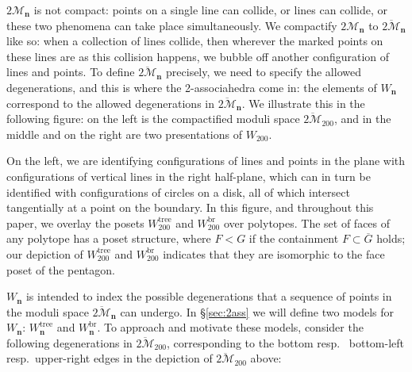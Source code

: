 \documentclass[11pt]{amsart}
\theoremstyle{definition}
\theoremstyle{remark}
\theoremstyle{plain}
\newcommand\cM{\mathcal{M}}
\newcommand{\bR}{\mathbb{R}}
\newcommand\bn{\mathbf{n}}
\newcommand{\on}{\operatorname}
\newcommand{\tree}{{\on{tree}}}
\newcommand{\br}{{\on{br}}}
\newcommand{\ol}{\overline}
\begin{document}
$2\cM_\bn$ is not compact: points on a single line can collide, or lines can collide, or these two phenomena can take place simultaneously.
We compactify $2\cM_\bn$ to $\ol{2\cM}_\bn$ like so: when a collection of lines collide, then wherever the marked points on these lines are as this collision happens, we bubble off another configuration of lines and points.
To define $\ol{2\cM}_\bn$ precisely, we need to specify the allowed degenerations, and this is where the 2-associahedra come in: the elements of $W_\bn$ correspond to the allowed degenerations in $\ol{2\cM}_\bn$.
We illustrate this in the following figure: on the left is the compactified moduli space $\ol{2\cM}_{200}$, and in the middle and on the right are two presentations of $W_{200}$.

\begin{figure}[H]
\centering
\def\svgwidth{1.0\columnwidth}

\end{figure}

\noindent
On the left, we are identifying configurations of lines and points in the plane with configurations of vertical lines in the right half-plane, which can in turn be identified with configurations of circles on a disk, all of which intersect tangentially at a point on the boundary.
In this figure, and throughout this paper, we overlay the posets $W_{200}^\tree$ and $W_{200}^\br$ over polytopes.
The set of faces of any polytope has a poset structure, where $F<G$ if the containment $F \subset \ol G$ holds; our depiction of $W_{200}^\tree$ and $W_{200}^\br$ indicates that they are isomorphic to the face poset of the pentagon.



$W_\bn$ is intended to index the possible degenerations that a sequence of points in the moduli space $\ol{2\cM}_\bn$ can undergo.
In
\S\ref{sec:2ass}
we will define two models for $W_\bn$: $W_\bn^\tree$ and $W_\bn^\br$.
To approach and motivate these models, consider the following degenerations in $\ol{2\cM}_{200}$, corresponding to the bottom resp.\
bottom-left
resp.\ upper-right edges in the depiction of $\ol{2\cM}_{200}$ above:
\end{document}
